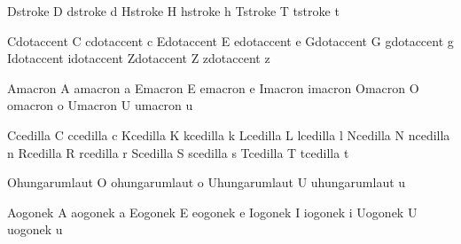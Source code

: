  Dstroke {D}
 dstroke {d}
 Hstroke {H}
 hstroke {h}
 Tstroke {T}
 tstroke {t}

 Cdotaccent {\buildtextaccent\textdotaccent C}
 cdotaccent {\buildtextaccent\textdotaccent c}
 Edotaccent {\buildtextaccent\textdotaccent E}
 edotaccent {\buildtextaccent\textdotaccent e}
 Gdotaccent {\buildtextaccent\textdotaccent G}
 gdotaccent {\buildtextaccent\textdotaccent g}
 Idotaccent {\buildtextaccent\textdotaccent \dotlessI}
 idotaccent {\buildtextaccent\textdotaccent \dotlessi}
 Zdotaccent {\buildtextaccent\textdotaccent Z}
 zdotaccent {\buildtextaccent\textdotaccent z}

 Amacron {\buildtextaccent\textmacron A}
 amacron {\buildtextaccent\textmacron a}
 Emacron {\buildtextaccent\textmacron E}
 emacron {\buildtextaccent\textmacron e}
 Imacron {\buildtextaccent\textmacron \dotlessI}
 imacron {\buildtextaccent\textmacron \dotlessi}
 Omacron {\buildtextaccent\textmacron O}
 omacron {\buildtextaccent\textmacron o}
 Umacron {\buildtextaccent\textmacron U}
 umacron {\buildtextaccent\textmacron u}

 Ccedilla {\buildtextcedilla C}
 ccedilla {\buildtextcedilla c}
 Kcedilla {\buildtextcedilla K}
 kcedilla {\buildtextcedilla k}
 Lcedilla {\buildtextcedilla L}
 lcedilla {\buildtextcedilla l}
 Ncedilla {\buildtextcedilla N}
 ncedilla {\buildtextcedilla n}
 Rcedilla {\buildtextcedilla R}
 rcedilla {\buildtextcedilla r}
 Scedilla {\buildtextcedilla S}
 scedilla {\buildtextcedilla s}
 Tcedilla {\buildtextcedilla T}
 tcedilla {\buildtextcedilla t}

 Ohungarumlaut {\buildtextaccent\texthungarumlaut O} 
 ohungarumlaut {\buildtextaccent\texthungarumlaut o}
 Uhungarumlaut {\buildtextaccent\texthungarumlaut U}
 uhungarumlaut {\buildtextaccent\texthungarumlaut u}

 Aogonek {\buildtextogonek A}
 aogonek {\buildtextogonek a}
 Eogonek {\buildtextogonek E}
 eogonek {\buildtextogonek e}
 Iogonek {\buildtextogonek I}
 iogonek {\buildtextogonek i}
 Uogonek {\buildtextogonek U}
 uogonek {\buildtextogonek u}

